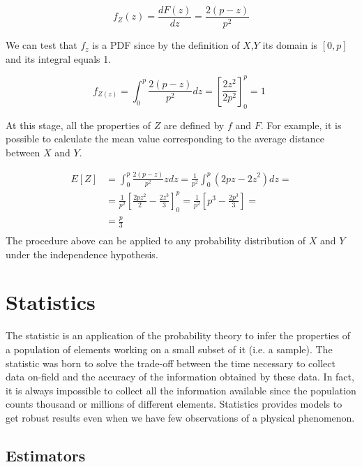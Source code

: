 \begin{equation}
f_Z(z)=\frac{dF(z)}{dz}=\frac{2\left(p-z\right)}{p^2}
\label{eq_Distance6}
\end{equation}

We can test that $f_z$ is a PDF since by the definition of $X$,$Y$ its domain is $[0,p]$ and its integral equals 1.

\begin{equation}
f_{Z\left(z\right)}=\int_{0}^{p}\frac{2\left(p-z\right)}{p^2}dz=\left[\frac{2z^2}{2p^2}\right]_0^p=1\ \ 
\label{eq_Distance7}
\end{equation}

At this stage, all the properties of $Z$ are defined by $f$ and $F$. For example, it is possible to calculate the mean value corresponding to the average distance between $X$ and $Y$. 

\begin{equation}
    \label{eq_Distance8}
    \begin{split}
    E\left[Z\right] & =\int_{0}^{p}\frac{2\left(p-z\right)}{p^2}zdz=\frac{1}{p^2}\int_{0}^{p}\left(2pz-{2z}^2\right)dz= \\
    & =\frac{1}{p^2}\left[\frac{2pz^2}{2}-\frac{{2z}^3}{3}\right]_0^p=\frac{1}{p^2}\left[p^3-\frac{2p^3}{3}\right]= \\
    & = \frac{p}{3} \\
    \end{split}
\end{equation}
The procedure above can be applied to any probability distribution of $X$ and $Y$ under the independence hypothesis.

\section{Statistics}

The statistic is an application of the probability theory to infer the properties of a population of elements working on a small subset of it (i.e. a sample). The statistic was born to solve the trade-off between the time necessary to collect data on-field and the accuracy of the information obtained by these data. In fact, it is always impossible to collect all the information available since the population counts thousand or millions of different elements. Statistics provides models to get robust results even when we have few observations of a physical phenomenon.

\subsection{Estimators} \label{secEstimators}

